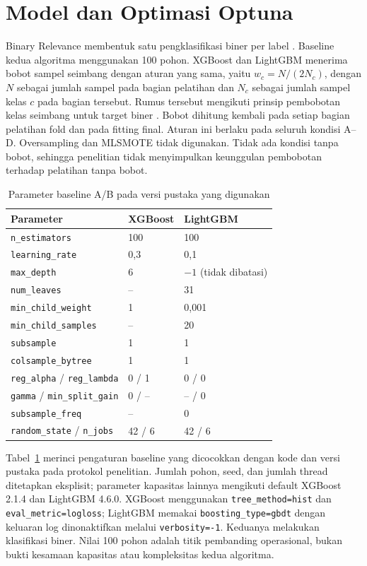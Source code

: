 \section{Model dan Optimasi Optuna}
Binary Relevance membentuk satu pengklasifikasi biner per label \cite{tsoumakas2007}. Baseline kedua algoritma menggunakan 100 pohon. XGBoost dan LightGBM menerima bobot sampel seimbang dengan aturan yang sama, yaitu $w_c=N/(2N_c)$, dengan $N$ sebagai jumlah sampel pada bagian pelatihan dan $N_c$ sebagai jumlah sampel kelas $c$ pada bagian tersebut. Rumus tersebut mengikuti prinsip pembobotan kelas seimbang untuk target biner \cite{sklearnweights2026}. Bobot dihitung kembali pada setiap bagian pelatihan fold dan pada fitting final. Aturan ini berlaku pada seluruh kondisi A--D. Oversampling dan MLSMOTE tidak digunakan. Tidak ada kondisi tanpa bobot, sehingga penelitian tidak menyimpulkan keunggulan pembobotan terhadap pelatihan tanpa bobot.

\begin{table}[htbp]
\centering
\caption{Parameter baseline A/B pada versi pustaka yang digunakan}
\label{tab:baseline_efektif}
\small
\begin{tabular}{>{\raggedright\arraybackslash}p{}ll}
\toprule
Parameter & XGBoost & LightGBM \\
\midrule
\texttt{n\_estimators} & 100 & 100 \\
\texttt{learning\_rate} & 0,3 & 0,1 \\
\texttt{max\_depth} & 6 & $-1$ (tidak dibatasi) \\
\texttt{num\_leaves} & -- & 31 \\
\texttt{min\_child\_weight} & 1 & 0,001 \\
\texttt{min\_child\_samples} & -- & 20 \\
\texttt{subsample} & 1 & 1 \\
\texttt{colsample\_bytree} & 1 & 1 \\
\texttt{reg\_alpha} / \texttt{reg\_lambda} & 0 / 1 & 0 / 0 \\
\texttt{gamma} / \texttt{min\_split\_gain} & 0 / -- & -- / 0 \\
\texttt{subsample\_freq} & -- & 0 \\
\texttt{random\_state} / \texttt{n\_jobs} & 42 / 6 & 42 / 6 \\
\bottomrule
\end{tabular}
\end{table}

Tabel~\ref{tab:baseline_efektif} merinci pengaturan baseline yang dicocokkan dengan kode dan versi pustaka pada protokol penelitian. Jumlah pohon, seed, dan jumlah thread ditetapkan eksplisit; parameter kapasitas lainnya mengikuti default XGBoost 2.1.4 dan LightGBM 4.6.0. XGBoost menggunakan \texttt{tree\_method=hist} dan \texttt{eval\_metric=logloss}; LightGBM memakai \texttt{boosting\_type=gbdt} dengan keluaran log dinonaktifkan melalui \texttt{verbosity=-1}. Keduanya melakukan klasifikasi biner. Nilai 100 pohon adalah titik pembanding operasional, bukan bukti kesamaan kapasitas atau kompleksitas kedua algoritma.

